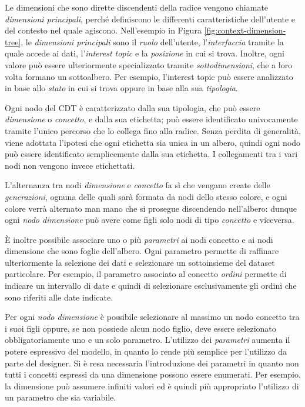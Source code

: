 Le dimensioni che sono dirette discendenti della radice vengono chiamate \emph{dimensioni principali}, perché definiscono le differenti caratteristiche dell'utente e del contesto nel quale agiscono. Nell'esempio in Figura \ref{fig:context-dimension-tree}, le \emph{dimensioni principali} sono il \emph{ruolo} dell'utente, l'\emph{interfaccia} tramite la quale accede ai dati, l'\emph{interest topic} e la \emph{posizione} in cui si trova. Inoltre, ogni valore può essere ulteriormente specializzato tramite \emph{sottodimensioni}, che a loro volta formano un sottoalbero. Per esempio, l'interest topic  può essere analizzato in base allo \emph{stato} in cui si trova oppure in base alla sua \emph{tipologia}.

Ogni nodo del CDT è caratterizzato dalla sua tipologia, che può essere \emph{dimensione} o \emph{concetto}, e dalla sua etichetta; può essere identificato univocamente tramite l'unico percorso che lo collega fino alla radice. Senza perdita di generalità, viene adottata l'ipotesi che ogni etichetta sia unica in un albero, quindi ogni nodo può essere identificato semplicemente dalla sua etichetta. I collegamenti tra i vari nodi non vengono invece etichettati.

L'alternanza tra nodi \emph{dimensione} e \emph{concetto} fa sì che vengano create delle \emph{generazioni}, ognuna delle quali sarà formata da nodi dello stesso colore, e ogni colore verrà alternato man mano che si prosegue discendendo nell'albero: dunque ogni \emph{nodo dimensione} può avere come figli solo nodi di tipo \emph{concetto} e viceversa.

\`E inoltre possibile associare uno o più \emph{parametri} ai nodi concetto e ai nodi dimensione che sono foglie dell'albero. Ogni parametro permette di raffinare ulteriormente la selezione dei dati e selezionare un sottoinsieme del dataset particolare. Per esempio, il parametro  associato al concetto \emph{ordini} permette di indicare un intervallo di date e quindi di selezionare esclusivamente gli ordini che sono riferiti alle date indicate.

Per ogni \emph{nodo dimensione} è possibile selezionare al massimo un nodo concetto tra i suoi figli oppure, se non possiede alcun nodo figlio, deve essere selezionato obbligatoriamente uno e un solo parametro. L'utilizzo dei \emph{parametri} aumenta il potere espressivo del modello, in quanto lo rende più semplice per l'utilizzo da parte del designer. Si è resa necessaria l'introduzione dei parametri in quanto non tutti i concetti espressi da una dimensione possono essere enumerati. Per esempio, la dimensione  può assumere infiniti valori ed è quindi più appropriato l'utilizzo di un parametro che sia variabile.

